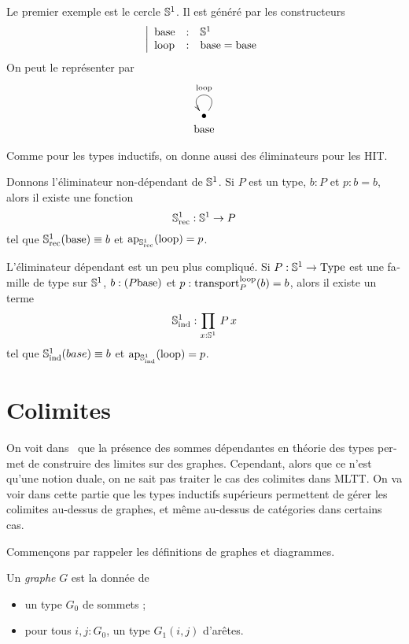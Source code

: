 \begin{otherlanguage}{french}
\begin{exmfr}
  Le premier exemple est le cercle $\mathbb{S}^1$. Il est généré par les
  constructeurs
  \[ \left| 
      \begin{array}{lll}
        \mathrm{base} & : & \mathbb{S}^1 \\
        \mathrm{loop} & : & \mathrm{base} = \mathrm{base}
      \end{array}
    \right.
  \]
  On peut le représenter par
  \[
    \xymatrix@R=0.1em{ \bullet \ar@(ur,ul)[]_\loopS \\ \baseS}
  \]
\end{exmfr}

Comme pour les types inductifs, on donne aussi des éliminateurs pour
les HIT.

\begin{exmfr}
  Donnons l'éliminateur non-dépendant de $\mathbb{S}^1$. Si $P$ est un type,
  $b:P$ et $p:b=b$, alors il existe une fonction 
  \[\mathbb{S}^1_{\mathrm{rec}} : \mathbb{S}^1 \to P\]
  tel que $\mathbb{S}^1_{\mathrm{rec}}(\mathrm{base}) \equiv b$ et
  $\mathrm{ap}_{\mathbb{S}^1_{\mathrm{rec}}}(\mathrm{loop}) = p$.

  L'éliminateur dépendant est un peu plus compliqué. Si
  $P:\mathbb{S}^1\to\operatorname{Type}$ est une famille de type sur $\mathbb{S}^1$, $b:(P\mathrm{base})$
  et $p:\operatorname{transport}_P^{\mathrm{loop}}(b) = b$, alors il existe un terme
  \[ \mathbb{S}^1_{\mathrm{ind}} : \prod_{x:\mathbb{S}^1}\, P\, x\]
  tel que $\mathbb{S}^1_{\mathrm{ind}}(base) \equiv b$ et
  $\mathrm{ap}_{\mathbb{S}^1_{\mathrm{ind}}}(\mathrm{loop}) = p$.
\end{exmfr}

\section{Colimites}

On voit dans~\cite{lumsdaine} que la présence des sommes dépendantes
en théorie des types permet de construire des limites sur des
graphes. Cependant, alors que ce n'est qu'une notion duale, on ne sait
pas traiter le cas des colimites dans MLTT.  On va voir dans cette
partie que les types inductifs supérieurs permettent de gérer les
colimites au-dessus de graphes, et même au-dessus de catégories dans
certains cas.

Commençons par rappeler les définitions de graphes et diagrammes.


\begin{defifr}[Graphe]
  Un {\em graphe} $G$ est la donnée de
  \begin{itemize}
  \item un type $G_0$ de sommets ;
  \item pour tous $i,j:G_0$, un type $G_1(i,j)$ d'arêtes.
  \end{itemize}
\end{defifr}


\end{otherlanguage}
